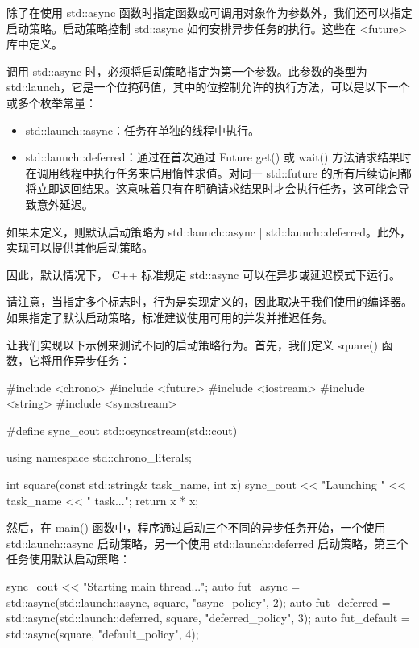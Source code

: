 除了在使用 std::async 函数时指定函数或可调用对象作为参数外，我们还可以指定启动策略。启动策略控制 std::async 如何安排异步任务的执行。这些在 <future> 库中定义。

调用 std::async 时，必须将启动策略指定为第一个参数。此参数的类型为 std::launch，它是一个位掩码值，其中的位控制允许的执行方法，可以是以下一个或多个枚举常量：

\begin{itemize}
\item
std::launch::async：任务在单独的线程中执行。

\item
std::launch::deferred：通过在首次通过 Future get() 或 wait() 方法请求结果时在调用线程中执行任务来启用惰性求值。对同一 std::future 的所有后续访问都将立即返回结果。这意味着只有在明确请求结果时才会执行任务，这可能会导致意外延迟。
\end{itemize}

如果未定义，则默认启动策略为 std::launch::async | std::launch::deferred。此外，实现可以提供其他启动策略。

因此，默认情况下， C++ 标准规定 std::async 可以在异步或延迟模式下运行。

请注意，当指定多个标志时，行为是实现定义的，因此取决于我们使用的编译器。如果指定了默认启动策略，标准建议使用可用的并发并推迟任务。

让我们实现以下示例来测试不同的启动策略行为。首先，我们定义 square() 函数，它将用作异步任务：

\begin{cpp}
#include <chrono>
#include <future>
#include <iostream>
#include <string>
#include <syncstream>

#define sync_cout std::osyncstream(std::cout)

using namespace std::chrono_literals;

int square(const std::string& task_name, int x) {
    sync_cout << "Launching " << task_name
              << " task...\n";
    return x * x;
}
\end{cpp}

然后，在 main() 函数中，程序通过启动三个不同的异步任务开始，一个使用 std::launch::async 启动策略，另一个使用 std::launch::deferred 启动策略，第三个任务使用默认启动策略：

\begin{cpp}
sync_cout << "Starting main thread...\n";
auto fut_async = std::async(std::launch::async,
                        square, "async_policy", 2);
auto fut_deferred = std::async(std::launch::deferred,
                        square, "deferred_policy", 3);
auto fut_default = std::async(square,
                        "default_policy", 4);
\end{cpp}

